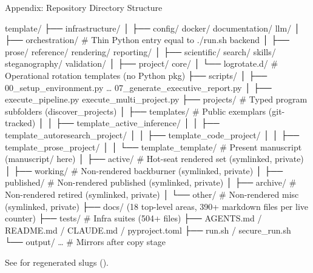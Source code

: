 \documentclass[
  ignorenonframetext,
]{beamer}
\author{\texorpdfstring{}{}}
\date{}
\newenvironment{Shaded}{}{}
\newcommand{\NormalTok}[1]{#1}
\begin{document}
\begin{frame}
\newpage
\end{frame}

\begin{frame}{Appendix: Repository Directory
Structure}
\protect{}\label{appendix-directory}
\begin{Shaded}
\begin{Highlighting}[]
\NormalTok{template/}
\NormalTok{├── infrastructure/}
\NormalTok{│   ├── config/ docker/ documentation/ llm/}
\NormalTok{│   ├── orchestration/   \# Thin Python entry equal to \textasciigrave{}./run.sh\textasciigrave{} backend}
\NormalTok{│   ├── prose/ reference/ rendering/ reporting/}
\NormalTok{│   ├── scientific/ search/ skills/ steganography/ validation/}
\NormalTok{│   ├── project/ core/}
\NormalTok{│   └── logrotate.d/      \# Operational rotation templates (no Python pkg)}
\NormalTok{├── scripts/}
\NormalTok{│   ├── 00\_setup\_environment.py … 07\_generate\_executive\_report.py}
\NormalTok{│   ├── execute\_pipeline.py execute\_multi\_project.py}
\NormalTok{├── projects/                    \# Typed program subfolders (\textasciigrave{}discover\_projects\textasciigrave{})}
\NormalTok{│   ├── templates/               \# Public exemplars (git{-}tracked)}
\NormalTok{│   │   ├── template\_active\_inference/}
\NormalTok{│   │   ├── template\_autoresearch\_project/}
\NormalTok{│   │   ├── template\_code\_project/}
\NormalTok{│   │   ├── template\_prose\_project/}
\NormalTok{│   │   └── template\_template/   \# Present manuscript (\textasciigrave{}manuscript/\textasciigrave{} here)}
\NormalTok{│   ├── active/                  \# Hot{-}seat rendered set (symlinked, private)}
\NormalTok{│   ├── working/                 \# Non{-}rendered backburner (symlinked, private)}
\NormalTok{│   ├── published/               \# Non{-}rendered published (symlinked, private)}
\NormalTok{│   ├── archive/                 \# Non{-}rendered retired (symlinked, private)}
\NormalTok{│   └── other/                   \# Non{-}rendered misc (symlinked, private)}
\NormalTok{├── docs/ (18 top{-}level areas, 390+ markdown files per live counter)}
\NormalTok{├── tests/                       \# Infra suites (504+ files)}
\NormalTok{├── AGENTS.md / README.md / CLAUDE.md / pyproject.toml}
\NormalTok{├── run.sh / secure\_run.sh}
\NormalTok{└── output/ …                    \# Mirrors after copy stage}
\end{Highlighting}
\end{Shaded}

See  for regenerated slugs
().
\end{frame}
\end{document}

